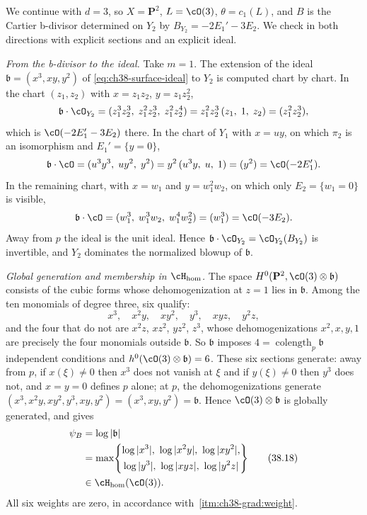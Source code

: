 \begin{example}
\label{ex:ch38-fs-from-bdivisor-and-back}
We continue  with $d=3$, so
$X=\mathbf P^2$, $L=\cO(3)$, $\theta=c_1(L)$, and $B$ is the
Cartier b-divisor determined on $Y_2$ by
$B_{Y_2}=-2E_1'-3E_2$.  We check
 in both directions with explicit
sections and an explicit ideal.

\emph{From the b-divisor to the ideal.}  Take $m=1$.  The extension of
the ideal $\mathfrak b=(x^3,xy,y^2)$ of
\eqref{eq:ch38-surface-ideal} to $Y_2$ is computed chart by chart.  In
the chart $(z_1,z_2)$ with $x=z_1z_2$, $y=z_1z_2^2$,
\[
 \mathfrak b\cdot\cO_{Y_2}
 =(z_1^3z_2^3,\;z_1^2z_2^3,\;z_1^2z_2^4)
 =z_1^2z_2^3\,(z_1,\;1,\;z_2)
 =(z_1^2z_2^3),
\]
which is $\cO(-2E_1'-3E_2)$ there.  In the chart of $Y_1$ with
$x=uy$, on which $\pi_2$ is an isomorphism and
$E_1'=\{y=0\}$,
\[
 \mathfrak b\cdot\cO
 =(u^3y^3,\;uy^2,\;y^2)=y^2\,(u^3y,\;u,\;1)=(y^2)
 =\cO(-2E_1').
\]
In the remaining chart, with $x=w_1$ and $y=w_1^2w_2$, on which only
$E_2=\{w_1=0\}$ is visible,
\[
 \mathfrak b\cdot\cO
 =(w_1^3,\;w_1^3w_2,\;w_1^4w_2^2)=(w_1^3)=\cO(-3E_2).
\]
Away from $p$ the ideal is the unit ideal.  Hence
$\mathfrak b\cdot\cO_{Y_2}=\cO_{Y_2}(B_{Y_2})$ is invertible, and
$Y_2$ dominates the normalized blowup of $\mathfrak b$.

\emph{Global generation and membership in $\cH_{\mathrm{hom}}$.}  The
space $H^0(\mathbf P^2,\cO(3)\otimes\mathfrak b)$ consists of the cubic
forms whose dehomogenization at $z=1$ lies in $\mathfrak b$.  Among the
ten monomials of degree three, six qualify:
\[
 x^3,\quad x^2y,\quad xy^2,\quad y^3,\quad xyz,\quad y^2z,
\tag{38.17}\label{eq:ch38-surface-sections}
\]
and the four that do not are $x^2z$, $xz^2$, $yz^2$, $z^3$, whose
dehomogenizations $x^2,x,y,1$ are precisely the four monomials outside
$\mathfrak b$.  So $\mathfrak b$ imposes
$4=\operatorname{colength}_p\mathfrak b$ independent conditions and
$h^0(\cO(3)\otimes\mathfrak b)=6$.  These six sections generate: away
from $p$, if $x(\xi)\neq0$ then $x^3$ does not vanish at $\xi$ and
if $y(\xi)\neq0$ then $y^3$ does not, and $x=y=0$ defines
$p$ alone; at $p$, the dehomogenizations generate
$(x^3,x^2y,xy^2,y^3,xy,y^2)=(x^3,xy,y^2)=\mathfrak b$.  Hence
$\cO(3)\otimes\mathfrak b$ is globally generated, and
 gives
\[
 \begin{aligned}
 \psi_B&=\log|\mathfrak b|\\
 &=\max\!\left\{\begin{gathered}
   \log|x^3|,\ \log|x^2y|,\ \log|xy^2|,\\
   \log|y^3|,\ \log|xyz|,\ \log|y^2z|
   \end{gathered}\right\}\\
 &\in\cH_{\mathrm{hom}}(\cO(3)).
 \end{aligned}
\tag{38.18}\label{eq:ch38-surface-fs-presentation}
\]
All six weights are zero, in accordance with
\,\cref{itm:ch38-grad:weight}.


\end{example}
